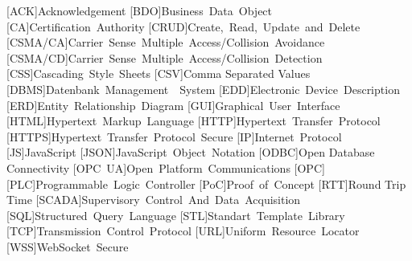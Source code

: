 \begin{multicols}{2}
  \begin{acronym}
    [ACK]{Acknowledgement}
    [BDO]{Business Data Object}
    [CA]{Certification Authority}
    [CRUD]{Create, Read, Update and Delete}
    [CSMA/CA]{Carrier Sense Multiple Access/Collision Avoidance}
    [CSMA/CD]{Carrier Sense Multiple Access/Collision Detection}
    [CSS]{Cascading Style Sheets}
    [CSV]{Comma Separated Values}
    [DBMS]{Datenbank Management  System}
    [EDD]{Electronic Device Description}
    [ERD]{Entity Relationship Diagram}
    [GUI]{Graphical User Interface}
    [HTML]{Hypertext Markup Language}
    [HTTP]{Hypertext Transfer Protocol}
    [HTTPS]{Hypertext Transfer Protocol Secure}
    [IP]{Internet Protocol}
    [JS]{JavaScript}
    [JSON]{JavaScript Object Notation}
    [ODBC]{Open Database Connectivity}
    [OPC UA]{Open Platform Communications}
    [OPC]{}
    [PLC]{Programmable Logic Controller}
    [PoC]{Proof of Concept}
    [RTT]{Round Trip Time}
    [SCADA]{Supervisory Control And Data Acquisition}
    [SQL]{Structured Query Language}
    [STL]{Standart Template Library}
    [TCP]{Transmission Control Protocol}
    [URL]{Uniform Resource Locator}
    [WSS]{WebSocket Secure}
  \end{acronym}
\end{multicols}
